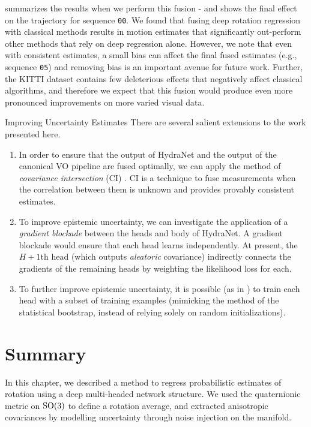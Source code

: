  summarizes the results when we perform this fusion - and  shows the final effect on the trajectory for sequence \texttt{00}. We found that fusing deep rotation regression with classical methods results in motion estimates that significantly out-perform other methods that rely on deep regression alone. However, we note that even with consistent estimates, a small bias can affect the final fused estimates (e.g., sequence \texttt{05}) and removing bias is an important avenue for future work. Further, the KITTI dataset contains few deleterious effects that negatively affect classical algorithms, and therefore we expect that this fusion would produce even more pronounced improvements on more varied visual data.

\begin{remark}{Improving Uncertainty Estimates}
	There are several salient extensions to the work presented here. 
	\begin{enumerate}
	\item 	In order to ensure that the output of HydraNet and the output of the canonical VO pipeline are fused optimally, we can apply the method of \textit{covariance intersection} (CI) \citep{julier2007using}. CI is a technique to fuse measurements when the correlation between them is unknown and provides provably consistent estimates.
	\item To improve epistemic uncertainty, we can investigate the application of a \textit{gradient blockade} \citep{brachmann2019ngransac} between the heads and body of HydraNet. A gradient blockade would ensure that each head learns independently. At present, the $H+1$th head (which outputs \textit{aleatoric} covariance) indirectly connects the gradients of the remaining heads by weighting the likelihood loss for each.
	\item To further improve epistemic uncertainty, it is possible (as in \cite{Osband2016}) to train each head with a subset of training examples (mimicking the method of the statistical bootstrap, instead of relying solely on random initializations).
	\end{enumerate}
 \end{remark}



\section{Summary}
In this chapter, we described a method to regress probabilistic estimates of rotation using a deep multi-headed network structure. We used the quaternionic metric on $\mathrm{SO}(3)$ to define a rotation average, and extracted anisotropic covariances by modelling uncertainty through noise injection on the manifold. 

